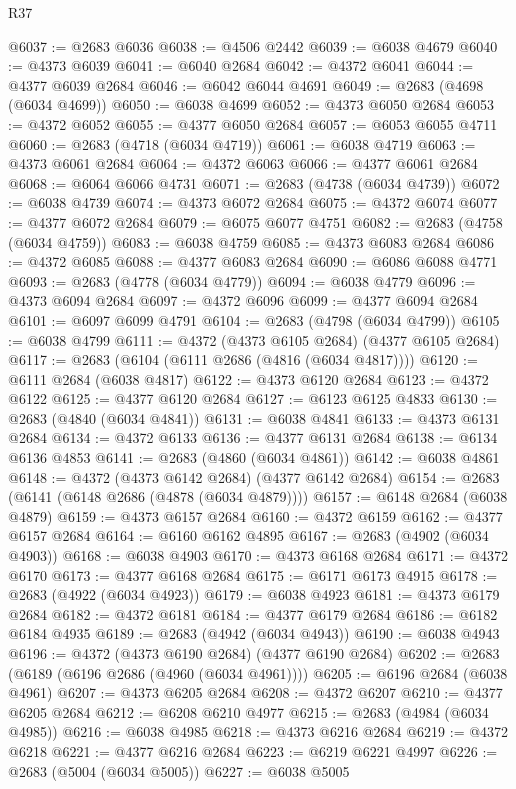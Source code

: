 \begin{lexlean}{R37}
\begin{coremodule}
@6037 := @2683 @6036
@6038 := @4506 @2442
@6039 := @6038 @4679
@6040 := @4373 @6039
@6041 := @6040 @2684
@6042 := @4372 @6041
@6044 := @4377 @6039 @2684
@6046 := @6042 @6044 @4691
@6049 := @2683 (@4698 (@6034 @4699))
@6050 := @6038 @4699
@6052 := @4373 @6050 @2684
@6053 := @4372 @6052
@6055 := @4377 @6050 @2684
@6057 := @6053 @6055 @4711
@6060 := @2683 (@4718 (@6034 @4719))
@6061 := @6038 @4719
@6063 := @4373 @6061 @2684
@6064 := @4372 @6063
@6066 := @4377 @6061 @2684
@6068 := @6064 @6066 @4731
@6071 := @2683 (@4738 (@6034 @4739))
@6072 := @6038 @4739
@6074 := @4373 @6072 @2684
@6075 := @4372 @6074
@6077 := @4377 @6072 @2684
@6079 := @6075 @6077 @4751
@6082 := @2683 (@4758 (@6034 @4759))
@6083 := @6038 @4759
@6085 := @4373 @6083 @2684
@6086 := @4372 @6085
@6088 := @4377 @6083 @2684
@6090 := @6086 @6088 @4771
@6093 := @2683 (@4778 (@6034 @4779))
@6094 := @6038 @4779
@6096 := @4373 @6094 @2684
@6097 := @4372 @6096
@6099 := @4377 @6094 @2684
@6101 := @6097 @6099 @4791
@6104 := @2683 (@4798 (@6034 @4799))
@6105 := @6038 @4799
@6111 := @4372 (@4373 @6105 @2684) (@4377 @6105 @2684)
@6117 := @2683 (@6104 (@6111 @2686 (@4816 (@6034 @4817))))
@6120 := @6111 @2684 (@6038 @4817)
@6122 := @4373 @6120 @2684
@6123 := @4372 @6122
@6125 := @4377 @6120 @2684
@6127 := @6123 @6125 @4833
@6130 := @2683 (@4840 (@6034 @4841))
@6131 := @6038 @4841
@6133 := @4373 @6131 @2684
@6134 := @4372 @6133
@6136 := @4377 @6131 @2684
@6138 := @6134 @6136 @4853
@6141 := @2683 (@4860 (@6034 @4861))
@6142 := @6038 @4861
@6148 := @4372 (@4373 @6142 @2684) (@4377 @6142 @2684)
@6154 := @2683 (@6141 (@6148 @2686 (@4878 (@6034 @4879))))
@6157 := @6148 @2684 (@6038 @4879)
@6159 := @4373 @6157 @2684
@6160 := @4372 @6159
@6162 := @4377 @6157 @2684
@6164 := @6160 @6162 @4895
@6167 := @2683 (@4902 (@6034 @4903))
@6168 := @6038 @4903
@6170 := @4373 @6168 @2684
@6171 := @4372 @6170
@6173 := @4377 @6168 @2684
@6175 := @6171 @6173 @4915
@6178 := @2683 (@4922 (@6034 @4923))
@6179 := @6038 @4923
@6181 := @4373 @6179 @2684
@6182 := @4372 @6181
@6184 := @4377 @6179 @2684
@6186 := @6182 @6184 @4935
@6189 := @2683 (@4942 (@6034 @4943))
@6190 := @6038 @4943
@6196 := @4372 (@4373 @6190 @2684) (@4377 @6190 @2684)
@6202 := @2683 (@6189 (@6196 @2686 (@4960 (@6034 @4961))))
@6205 := @6196 @2684 (@6038 @4961)
@6207 := @4373 @6205 @2684
@6208 := @4372 @6207
@6210 := @4377 @6205 @2684
@6212 := @6208 @6210 @4977
@6215 := @2683 (@4984 (@6034 @4985))
@6216 := @6038 @4985
@6218 := @4373 @6216 @2684
@6219 := @4372 @6218
@6221 := @4377 @6216 @2684
@6223 := @6219 @6221 @4997
@6226 := @2683 (@5004 (@6034 @5005))
@6227 := @6038 @5005

\end{coremodule}
\end{lexlean}
